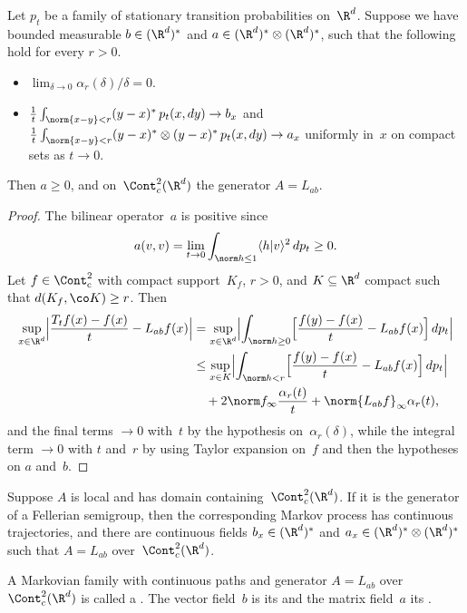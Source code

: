 \begin	{theorem}
Let $p_t$ be a family of stationary transition probabilities on~$\R^d$.
Suppose we have bounded measurable \( b \in (\R^d)^* \)
and \( a \in (\R^d)^*\otimes(\R^d)^* \),
such that the following hold for every \( r > 0 \).
\begin	{itemize}
\item	\( \lim_{\delta\to0} \alpha_r(\delta)/\delta = 0 \).
\item	\( \tfrac1t\int_{\norm{x-y}<r} (y-x)^* \,p_t(x,dy) \to b_x \)
	and \( \tfrac1t\int_{\norm{x-y}<r} (y-x)^* \otimes (y-x)^*
		\,p_t(x,dy) \to a_x \)
	uniformly in~$x$ on compact sets as \( t \to 0 \).
\end	{itemize}
Then \( a \ge 0 \),
and on~$\Cont^2_c(\R^d)$ the generator \( A = L_{ab} \).
\end	{theorem}
\begin	{proof}
The bilinear operator~$a$ is positive since
\[ a(v,v) = \lim_{t\to0} \int_{\norm h\le1} \langle h\vert v\rangle^2 \,dp_t
	\ge 0 \text. \]
Let \( f \in \Cont^2_\mathrm c \) with compact support~$K_f$, \( r > 0 \),
and \( K \subseteq \R^d \) compact such that \( d(K_f,\co K) \ge r \).
Then
\begin	{align*}
	\sup_{x\in\R^d} \Bigl\lvert
		\frac{T_t f(x) - f(x)}{t} - L_{ab}f(x)
	\Bigr\rvert
	&= \sup_{x\in\R^d} \Bigl\lvert
		\int_{\norm h\ge0}\Bigl[
			\frac{f(y)-f(x)}{t} - L_{ab}f(x)
		\Bigr] \,dp_t
	   \Bigr\rvert \\
	&\le \sup_{x\in K} \Bigl\lvert
			\int_{\norm h<r}\Bigl[
				\frac{f(y)-f(x)}{t} - L_{ab}f(x)
			\Bigr] \,dp_t
		\Bigr\rvert \\
	&\quad	+ 2\norm f_\infty \frac{\alpha_r(t)}{t}
		+ \norm{L_{ab}f}_\infty \alpha_r(t)
	\text,
\end	{align*}
and the final terms \( \to 0 \) with~$t$
by the hypothesis on~$\alpha_r(\delta)$,
while the integral term \( \to 0 \) with $t$ and~$r$
by using Taylor expansion on~$f$
and then the hypotheses on $a$ and~$b$.
\end	{proof}

\begin	{theorem}
Suppose $A$ is local and has domain containing~$\Cont^2_c(\R^d)$.
If it is the generator of a Fellerian semigroup,
then the corresponding Markov process has continuous trajectories,
and there are continuous fields \( b_x \in (\R^d)^* \)
and \( a_x \in (\R^d)^* \otimes (\R^d)^* \)
such that \( A = L_{ab} \) over~$\Cont^2_c(\R^d)$.
\end	{theorem}

\begin	{definition}
A Markovian family with continuous paths
and generator \( A = L_{ab} \) over~$\Cont^2_c(\R^d)$
is called a .
The vector field~$b$ is its 
and the matrix field~$a$ its .
\end	{definition}
